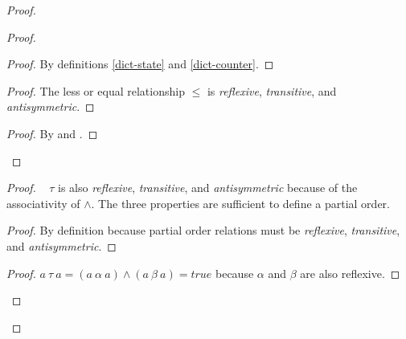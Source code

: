 \documentclass[9pt, oneside]{article}   	%
\begin{document}
\begin{proof}
\begin{proof}
			\begin{proof}
				By definitions \ref{dict-state} and \ref{dict-counter}.
			\end{proof}
			
			\begin{proof}
				The less or equal relationship $\leq$ is \textit{reflexive}, \textit{transitive}, and \textit{antisymmetric}.
			\end{proof}

			\qedstep
			\begin{proof}
				By  and .
			\end{proof}
		\end{proof}
		
		\begin{proof}
			\pfsketch~ $\tau$ is also \textit{reflexive}, \textit{transitive}, and \textit{antisymmetric} because of the associativity of $\wedge$. The three properties are sufficient to define a partial order.
			\begin{proof}
				By definition because partial order relations must be \textit{reflexive}, \textit{transitive}, and \textit{antisymmetric}.
			\end{proof}
	
			\begin{proof}
				$a ~\tau~ a = (a ~\alpha~ a) \wedge (a ~\beta~ a) = true$ because  $\alpha$ and $\beta$ are also reflexive.
			\end{proof}
			

\end{proof}
\end{proof}
\end{document}
